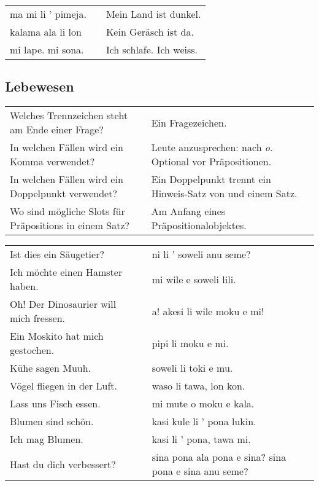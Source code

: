 \begin{supertabular}{p{5,5cm}|ll}
ma mi li ' pimeja. && Mein Land ist dunkel. \\
kalama ala li lon && Kein Geräsch ist da.\\
mi lape. mi sona. && Ich schlafe. Ich weiss. \\
\end{supertabular} 

\newpage
%
\subsection*{Lebewesen} 
\label{'living_things'}

\begin{supertabular}{p{5,5cm}|ll}
Welches Trennzeichen steht am Ende einer Frage? && Ein Fragezeichen. \\ %
In welchen Fällen wird ein Komma verwendet? && Leute anzusprechen: nach \textit{o}. Optional vor Präpositionen. \\ %
In welchen Fällen wird ein Doppelpunkt verwendet? && Ein Doppelpunkt trennt ein Hinweis-Satz von und einem Satz. \\ %
Wo sind mögliche Slots für Präpositions in einem Satz? && Am Anfang eines Präpositionalobjektes.  \\ %
\end{supertabular}

\begin{supertabular}{p{5,5cm}|ll}
Ist dies ein Säugetier? && ni li ' soweli anu seme?  \\ %
Ich möchte einen Hamster haben.  && mi wile e soweli lili. \\ %
Oh! Der Dinosaurier will mich fressen.  && a! akesi li wile moku e mi! \\ %
Ein Moskito hat mich gestochen.  && pipi li moku e mi.  \\ %
Kühe sagen Muuh.  && soweli li toki e mu. \\ %
Vögel fliegen in der Luft.  && waso li tawa, lon kon. \\ %
Lass uns Fisch essen.  && mi mute o moku e kala. \\ %
Blumen sind schön.   && kasi kule li ' pona lukin. \\ %
Ich mag Blumen.  && kasi li ' pona, tawa mi. \\ %
Hast du dich verbessert? && sina pona ala pona e sina? sina pona e sina anu seme? \\ %
\end{supertabular}  

